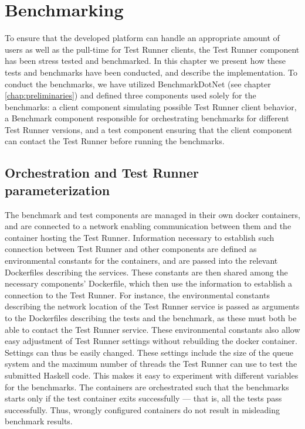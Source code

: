 \chapter{Benchmarking} \label{chap:Benchmarking}
To ensure that the developed platform can handle an appropriate amount of users as well as the pull-time for Test Runner clients, the Test Runner component has been stress tested and benchmarked.
In this chapter we present how these tests and benchmarks have been conducted, and describe the implementation. To conduct the benchmarks, we have utilized BenchmarkDotNet (see chapter \ref{chap:preliminaries}) and defined three components used solely for the benchmarks:
a client component simulating possible Test Runner client behavior, a Benchmark component responsible for orchestrating benchmarks for different Test Runner versions, and a test component ensuring that the client component can contact the Test Runner before running the benchmarks.

\section{Orchestration and Test Runner parameterization}
The benchmark and test components are managed in their own docker containers, and are connected to a network enabling communication between them and the container hosting the Test Runner. 
Information necessary to establish such connection between Test Runner and other components are defined as environmental constants for the containers, and are passed into the relevant Dockerfiles describing the services.
These constants are then shared among the necessary components' Dockerfile, which then use the information to establish a connection to the Test Runner.
For instance, the environmental constants describing the network location of the Test Runner service is passed as arguments to the Dockerfiles describing the tests and the benchmark, as these must both be able to contact the Test Runner service.
These environmental constants also allow easy adjustment of Test Runner settings without rebuilding the docker container.
Settings can thus be easily changed.
These settings include the size of the queue system and the maximum number of threads the Test Runner can use to test the submitted Haskell code.
This makes it easy to experiment with different variables for the benchmarks.  
The containers are orchestrated such that the benchmarks starts only if the test container exits successfully --- that is, all the tests pass successfully. 
Thus, wrongly configured containers do not result in misleading benchmark results.

